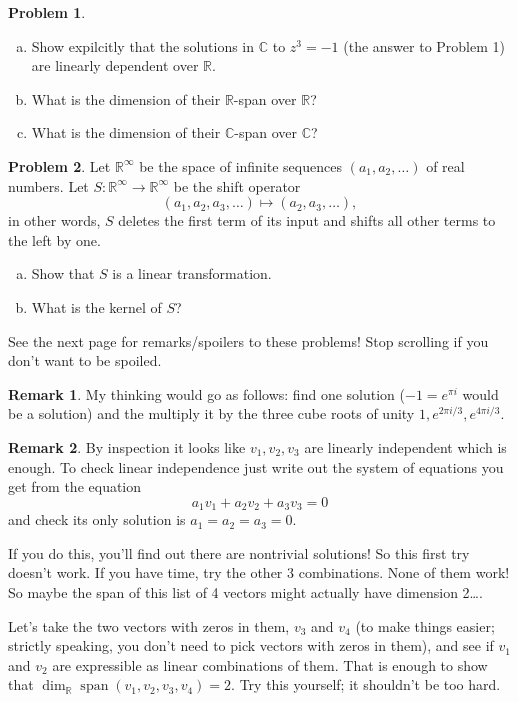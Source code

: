 \documentclass[11pt,oneside]{amsart}
\theoremstyle{definition}
\newtheorem{problem}{Problem}
\newtheorem{remark}{Remark}
\newcommand{\bC}{\mathbb{C}}
\newcommand{\bR}{\mathbb{R}}
\DeclareMathOperator{\Span}{span}
\begin{document}
    \begin{problem}
        \leavevmode\begin{enumerate}[(a)]
            \item Show expilcitly that the solutions in $\bC$ to $z^3=-1$ (the answer to Problem 1) are linearly dependent over $\bR$.
            \item What is the dimension of their $\bR$-span over $\bR$?
            \item What is the dimension of their $\bC$-span over $\bC$?
        \end{enumerate}
    \end{problem}

    \begin{problem}
        Let $\bR^\infty$ be the space of infinite sequences $(a_1,a_2,\dots)$ of real numbers. Let $S\colon\bR^\infty\to\bR^\infty$ be the shift operator
        \[(a_1,a_2,a_3,\dots)\mapsto (a_2,a_3,\dots),\]
        in other words, $S$ deletes the first term of its input and shifts all other terms to the left by one.
        \begin{enumerate}[(a)]
            \item Show that $S$ is a linear transformation.
            \item What is the kernel of $S$?
        \end{enumerate}
    \end{problem}

    \bigskip
    See the next page for remarks/spoilers to these problems! Stop scrolling if you don't want to be spoiled.

    \newpage
    
    \begin{remark}
        My thinking would go as follows: find one solution ($-1=e^{\pi i}$ would be a solution) and the multiply it by the three cube roots of unity $1, e^{2\pi i/3}, e^{4\pi i/3}$.
    \end{remark}

    \begin{remark}
        By inspection it looks like $v_1,v_2,v_3$ are linearly independent which is enough. To check linear independence just write out the system of equations you get from the equation
        \[a_1v_1+a_2v_2+a_3v_3=0\]
        and check its only solution is $a_1=a_2=a_3=0$.

        If you do this, you'll find out there are nontrivial solutions! So this first try doesn't work. If you have time, try the other 3 combinations. None of them work! So maybe the span of this list of 4 vectors might actually have dimension 2\ldots.

        Let's take the two vectors with zeros in them, $v_3$ and $v_4$ (to make things easier; strictly speaking, you don't need to pick vectors with zeros in them), and see if $v_1$ and $v_2$ are expressible as linear combinations of them. That is enough to show that $\dim_\bR\Span(v_1,v_2,v_3,v_4)=2$. Try this yourself; it shouldn't be too hard.
    \end{remark}
\end{document}
